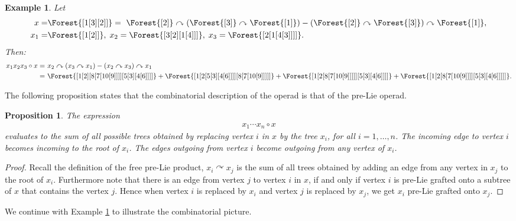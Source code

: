 \documentclass[10pt,a4paper]{article}
\newtheorem{proposition}[theorem]{Proposition}
\newtheorem{example}[theorem]{Example}
\begin{document}
\begin{example} \label{example::1}
Let
\allowdisplaybreaks
\begin{align*}
x=&\Forest{[1[3][2]]}=\ \Forest{[2]} \curvearrowright ( \Forest{[3]} \curvearrowright \Forest{[1]}) - (\Forest{[2]} \curvearrowright \Forest{[3]}) \curvearrowright \Forest{[1]}, \\
x_1=&\Forest{[1[2]]}, \; x_2= \Forest{[3[2][1[4]]]}, \; x_3=\Forest{[2[1[4[3]]]]}.
\end{align*}
Then:
\allowdisplaybreaks
\begin{align*}
x_1x_2x_3 \circ x =&\ x_2 \curvearrowright ( x_3 \curvearrowright x_1) - (x_2 \curvearrowright x_3) \curvearrowright x_1 \\
=&\ \Forest{[1[2][8[7[10[9]]]][5[3][4[6]]]]}+\Forest{[1[2[5[3][4[6]]]][8[7[10[9]]]]]}+\Forest{[1[2[8[7[10[9]]]]][5[3][4[6]]]]}+\Forest{[1[2[8[7[10[9]]]][5[3][4[6]]]]]}.
\end{align*}
\end{example}

The following proposition states that the combinatorial description of the operad is that of the pre-Lie operad.

\begin{proposition} \label{prop::6}
The expression
\begin{align*}
x_1 \cdots x_n \circ x
\end{align*}
evaluates to the sum of all possible trees obtained by replacing vertex $i$ in $x$ by the tree $x_i$, for all $i=1,\dots,n$. The incoming edge to vertex $i$ becomes incoming to the root of $x_i$. The edges outgoing from vertex $i$ become outgoing from any vertex of $x_i$.
\end{proposition}

\begin{proof}
Recall the definition of the free pre-Lie product, $x_i \curvearrowright x_j$ is the sum of all trees obtained by adding an edge from any vertex in $x_j$ to the root of $x_i$. Furthermore note that there is an edge from vertex $j$ to vertex $i$ in $x$, if and only if vertex $i$ is pre-Lie grafted onto a subtree of $x$ that contains the vertex $j$. Hence when vertex $i$ is replaced by $x_i$ and vertex $j$ is replaced by $x_j$, we get $x_i$ pre-Lie grafted onto $x_j$.
\end{proof}

We continue with Example \ref{example::1} to illustrate the combinatorial picture.
\end{document}
